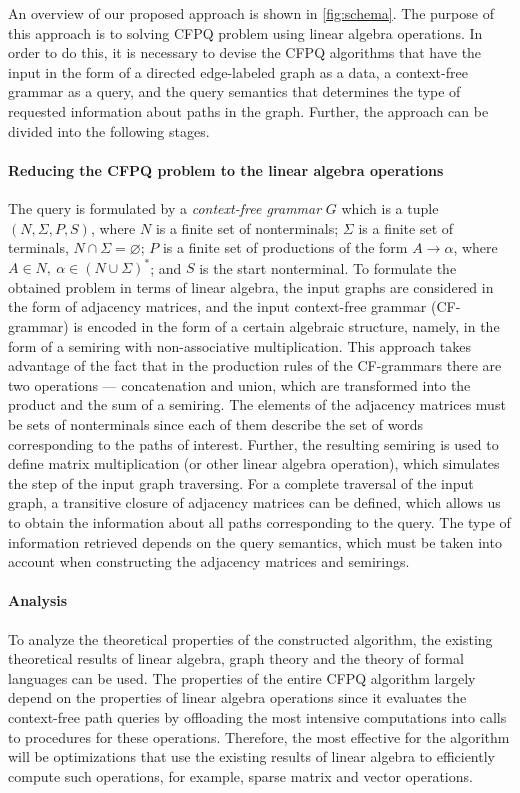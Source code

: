 \documentclass[sigconf, nonacm]{acmart}
\begin{document}
An overview of our proposed approach is shown in \autoref{fig:schema}. The purpose of this approach is to solving CFPQ problem using linear algebra operations. In order to do this, it is necessary to devise the CFPQ algorithms that have the input in the form of a directed edge-labeled graph as a data, a context-free grammar as a query, and the query semantics that determines the type of requested information about paths in the graph. Further, the approach can be divided into the following stages.

\paragraph{Reducing the CFPQ problem to the linear algebra operations} 
The query is formulated by a \emph{context-free grammar} $G$ which is a tuple $(N, \Sigma, P, S)$, where $N$ is a finite set of nonterminals; $\Sigma$ is a finite set of terminals, $N \cap \Sigma = \varnothing$; $P$ is a finite set of productions of the form $A \to \alpha$, where $A \in N,\ \alpha \in (N \cup \Sigma)^*$; and $S$ is the start nonterminal. To formulate the obtained problem in terms of linear algebra, the input graphs are considered in the form of adjacency matrices, and the input context-free grammar (CF-grammar) is encoded in the form of a certain algebraic structure, namely, in the form of a semiring with non-associative multiplication. This approach takes advantage of the fact that in the production rules of the CF-grammars there are two operations --- concatenation and union, which are transformed into the product and the sum of a semiring. The elements of the adjacency matrices must be sets of nonterminals since each of them describe the set of words corresponding to the paths of interest. Further, the resulting semiring is used to define matrix multiplication (or other linear algebra operation), which simulates the step of the input graph traversing. For a complete traversal of the input graph, a transitive closure of adjacency matrices can be defined, which allows us to obtain the information about all paths corresponding to the query. The type of information retrieved depends on the query semantics, which must be taken into account when constructing the adjacency matrices and semirings.


\paragraph{Analysis}
To analyze the theoretical properties of the constructed algorithm, the existing theoretical results of linear algebra, graph theory and the theory of formal languages can be used. The properties of the entire CFPQ algorithm largely depend on the properties of linear algebra operations since it evaluates the context-free path queries by offloading the most intensive computations into calls
to procedures for these operations. Therefore, the most effective for the algorithm will be optimizations that use the existing results of linear algebra to efficiently compute such operations, for example, sparse matrix and vector operations.
\end{document}
